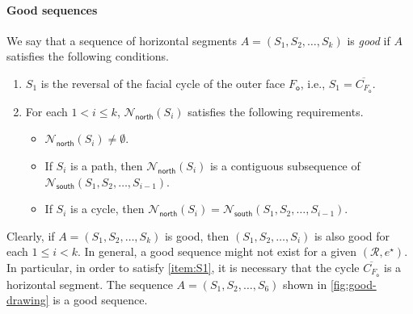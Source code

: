 \documentclass{article}\usepackage[a4paper,margin=20mm]{geometry}
\newcommand{\RR}{\mathcal{R}}
\newcommand{\FO}{F_\mathsf{o}}
\newcommand{\Nnorth}{\mathcal{N}_\mathsf{north}}
\newcommand{\Nsouth}{\mathcal{N}_\mathsf{south}}
\newcommand{\eref}{e^\star}
\begin{document}
\paragraph{Good sequences} 
We say that a sequence of horizontal segments $A = (S_1, S_2, \ldots, S_{k})$ is \emph{good} if $A$ satisfies the following conditions.
\begin{enumerate}[(S1)]
    \item \label{item:S1} $S_1$ is the reversal of the facial cycle of the outer face $\FO$, i.e., $S_1 = \overline{C_{\FO}}$.
    \item \label{item:S2} For each $1 < i \leq k$, $\Nnorth(S_i)$ satisfies the following requirements.
\begin{itemize}
    \item $\Nnorth(S_i) \neq \emptyset$.
    \item If $S_i$ is a path, then $\Nnorth(S_i)$ is a contiguous subsequence of $\Nsouth(S_1, S_2, \ldots, S_{i-1})$.
    \item If $S_i$ is a cycle, then $\Nnorth(S_i) = \Nsouth(S_1, S_2, \ldots, S_{i-1})$. 
\end{itemize}    
\end{enumerate}

Clearly, if $A=(S_1, S_2, \ldots, S_{k})$ is good, then $(S_1, S_2, \ldots, S_{i})$ is also good for each $1 \leq i < k$. In general, a good sequence might not exist for a given $(\RR,\eref)$. In particular, in order to satisfy \ref{item:S1}, it is necessary that the cycle $\overline{C_{\FO}}$ is a horizontal segment. The sequence $A=(S_1, S_2, \ldots, S_6)$ shown in \cref{fig:good-drawing} is a good sequence.
\end{document}
